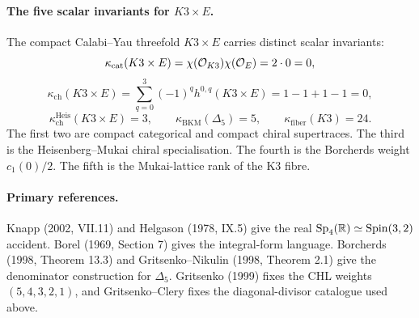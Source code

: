 \paragraph{The five scalar invariants for \(K3\times E\).}
The compact Calabi--Yau threefold \(K3\times E\) carries distinct
scalar invariants:
\[
  \kappa_{\mathrm{cat}}(K3\times E)
  =\chi(\mathcal{O}_{K3})\chi(\mathcal{O}_E)=2\cdot 0=0,
\]
\[
  \kappa_{\mathrm{ch}}(K3\times E)
  =
  \sum_{q=0}^3(-1)^q h^{0,q}(K3\times E)
  =1-1+1-1=0,
\]
\[
  \kappa_{\mathrm{ch}}^{\mathrm{Heis}}(K3\times E)=3,\qquad
  \kappa_{\mathrm{BKM}}(\Delta_5)=5,\qquad
  \kappa_{\mathrm{fiber}}(K3)=24.
\]
The first two are compact categorical and compact chiral supertraces.
The third is the Heisenberg--Mukai chiral specialisation.  The fourth is
the Borcherds weight \(c_1(0)/2\).  The fifth is the Mukai-lattice rank
of the K3 fibre.

\paragraph{Primary references.}
Knapp (2002, VII.11) and Helgason (1978, IX.5) give the real
\(\mathrm{Sp}_4(\mathbb{R})\simeq\mathrm{Spin}(3,2)\) accident.  Borel (1969, Section 7)
gives the integral-form language.  Borcherds (1998, Theorem 13.3) and
Gritsenko--Nikulin (1998, Theorem 2.1) give the denominator construction
for \(\Delta_5\).  Gritsenko (1999) fixes the CHL weights
\((5,4,3,2,1)\), and Gritsenko--Clery fixes the diagonal-divisor
catalogue used above.
